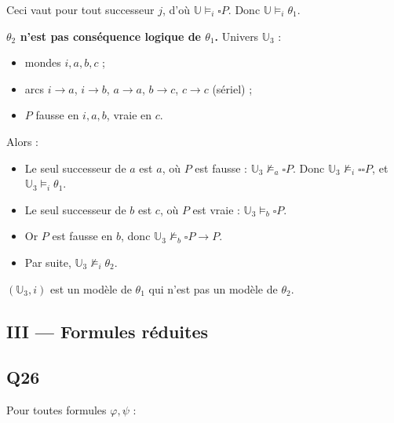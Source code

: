 \documentclass[11pt,a4paper]{article}
\providecommand{\tightlist}{\setlength{\itemsep}{0pt}\setlength{\parskip}{0pt}}
\providecommand{\Box}{\square}
\newcommand{\equationajustee}[1]{%
  \sbox{\boiteequation}{$\displaystyle #1$}%
  \ifdim\wd\boiteequation>\linewidth
    \[\resizebox{\linewidth}{!}{\usebox{\boiteequation}}\]%
  \else
    \[#1\]%
  \fi}
\begin{document}
Ceci vaut pour tout successeur \(j\), d'où \(\mathbb U\models_i\Box P\). Donc \(\mathbb U\models_i\theta_1\).

\textbf{\(\theta_2\) n'est pas conséquence logique de \(\theta_1\).} Univers \(\mathbb U_3\) :

\begin{itemize}
\tightlist
\item
  mondes \(i,a,b,c\) ;
\item
  arcs \(i\to a\), \(i\to b\), \(a\to a\), \(b\to c\), \(c\to c\) (sériel) ;
\item
  \(P\) fausse en \(i,a,b\), vraie en \(c\).
\end{itemize}

Alors :

\begin{itemize}
\tightlist
\item
  Le seul successeur de \(a\) est \(a\), où \(P\) est fausse : \(\mathbb U_3\not\models_a\Box P\). Donc \(\mathbb U_3\not\models_i\Box\Box P\), et \(\mathbb U_3\models_i\theta_1\).
\item
  Le seul successeur de \(b\) est \(c\), où \(P\) est vraie : \(\mathbb U_3\models_b\Box P\).
\item
  Or \(P\) est fausse en \(b\), donc \(\mathbb U_3\not\models_b\Box P\to P\).
\item
  Par suite, \(\mathbb U_3\not\models_i\theta_2\).
\end{itemize}

\((\mathbb U_3,i)\) est un modèle de \(\theta_1\) qui n'est pas un modèle de \(\theta_2\).

\hypertarget{iii-formules-ruxe9duites}{%
\subsection{III --- Formules réduites}\label{iii-formules-ruxe9duites}}

\hypertarget{q26}{%
\subsection{Q26}\label{q26}}

Pour toutes formules \(\varphi,\psi\) :

\equationajustee{\boxed{\begin{aligned}
\neg(\varphi\wedge\psi)&\equiv\neg\varphi\vee\neg\psi\\
\neg(\varphi\vee\psi)&\equiv\neg\varphi\wedge\neg\psi
\end{aligned}}}
\end{document}
